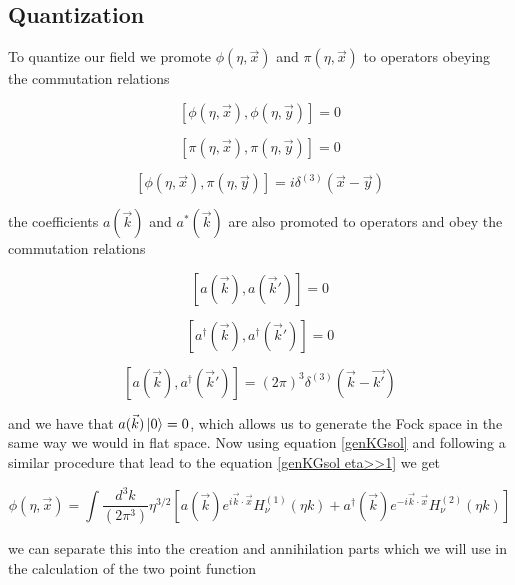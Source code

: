 \documentclass[a4paper,11pt]{article}
\numberwithin{equation}{section}
\numberwithin{figure}{section}
\begin{document}
\begin{large}
\subsection{Quantization}


To quantize our field we promote $\phi(\eta,\Vec{x})$ and $\pi(\eta,\Vec{x})$ to operators obeying the commutation relations

\begin{equation}
\label{cc1}
    [\phi(\eta,\Vec{x}),\phi(\eta,\Vec{y})]=0
\end{equation}

\begin{equation}
\label{cc2}
    [\pi(\eta,\Vec{x}),\pi(\eta,\Vec{y})]=0
\end{equation}

\begin{equation}
\label{cc3}
    [\phi(\eta,\Vec{x}),\pi(\eta,\Vec{y})]=i\delta^{(3)}(\Vec{x}-\Vec{y})
\end{equation}

the coefficients $a(\Vec{k})$ and $a^*(\Vec{k})$ are also promoted to operators and obey the commutation relations 

\begin{equation}
\label{cc4}    
    [a(\Vec{k}),a(\Vec{k}')]=0
\end{equation}

\begin{equation}
\label{cc5}    
    [a^\dagger(\Vec{k}),a^\dagger(\Vec{k}')]=0
\end{equation}


\begin{equation}
\label{cc6}    
    [a(\Vec{k}),a^\dagger(\Vec{k}')]=(2\pi)^3\delta^{(3)}(\Vec{k}-\Vec{k'})
\end{equation}


and we have that $a(\Vec{k})\ket{0}=0$, which allows us to generate the Fock space in the same way we would in flat space. Now using equation \eqref{genKGsol} and following a similar procedure that lead to the equation \eqref{genKGsol eta>>1} we get 

\begin{equation}
\label{quantphi}    
    \phi(\eta,\Vec{x})=\int \frac{d^3k}{(2\pi^3)}\eta^{3/2}[a(\Vec{k})e^{i\Vec{k}\cdot\Vec{x}}H_\nu^{(1)}(\eta k)+a^\dagger(\Vec{k})e^{-i\Vec{k}\cdot\Vec{x}}H_\nu^{(2)}(\eta k)]
\end{equation}

we can separate this into the creation and annihilation parts which we will use in the calculation of the two point function


\end{large}
\end{document}
